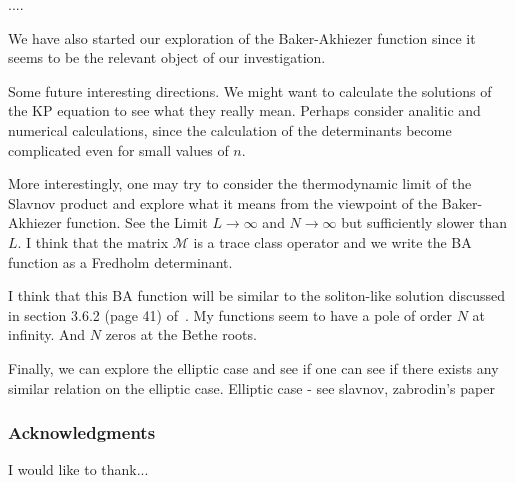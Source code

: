 \documentclass[a4paper,12pt]{amsart}
\begin{document}
....  

We have also started our exploration of the Baker-Akhiezer function since it seems to
be the relevant object of our investigation.  

Some future interesting directions. We might want to calculate the
solutions of the KP equation to see what they really mean. Perhaps
consider analitic and numerical calculations, since the calculation of
the determinants become complicated even for small values of \(n\).

More interestingly, one may try to consider the thermodynamic limit of
the Slavnov product and explore what it means from the viewpoint of
the Baker-Akhiezer function.  See the Limit \(L \to \infty\) and \(N
\to \infty\) but sufficiently slower than \(L\).  I think that the
matrix \(\mathcal{M}\) is a trace class operator and we write the BA
function as a Fredholm determinant.

I think that this BA function will be similar to the soliton-like
solution discussed in section 3.6.2 (page 41) of~\cite{Zabrodin2018}.
My functions seem to have a pole of order \(N\) at infinity. And \(N\)
zeros at the Bethe roots.

Finally, we can explore the elliptic case and see if one can see if
there exists any similar relation on the elliptic case.  Elliptic case
- see slavnov, zabrodin's paper



\subsubsection*{Acknowledgments}
I would like to thank...

\printbibliography
\end{document}
